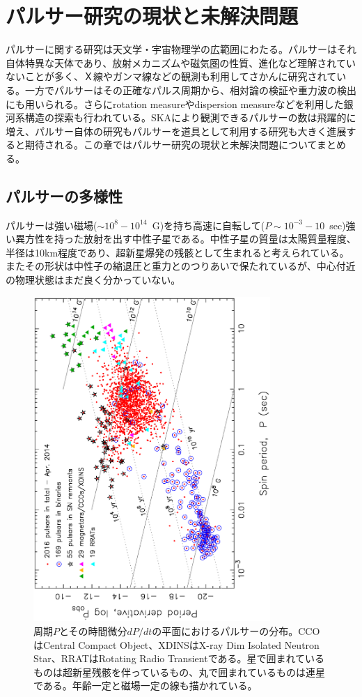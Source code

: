 \section{パルサー研究の現状と未解決問題}\label{pulsar.s1}

パルサーに関する研究は天文学・宇宙物理学の広範囲にわたる。パルサーはそれ自体特異な天体であり、放射メカニズムや磁気圏の性質、進化など理解されていないことが多く、Ｘ線やガンマ線などの観測も利用してさかんに研究されている。一方でパルサーはその正確なパルス周期から、相対論の検証や重力波の検出にも用いられる。さらにrotation measureやdispersion measureなどを利用した銀河系構造の探索も行われている。SKAにより観測できるパルサーの数は飛躍的に増え、パルサー自体の研究もパルサーを道具として利用する研究も大きく進展すると期待される。この章ではパルサー研究の現状と未解決問題についてまとめる。


\subsection{パルサーの多様性}

パルサーは強い磁場($\sim 10^8-10^{14}$~G)を持ち高速に自転して($P\sim 10^{-3}-10$~sec)強い異方性を持った放射を出す中性子星である。中性子星の質量は太陽質量程度、半径は10km程度であり、超新星爆発の残骸として生まれると考えられている。またその形状は中性子の縮退圧と重力とのつりあいで保たれているが、中心付近の物理状態はまだ良く分かっていない。

\begin{figure}[t]
\centering
\includegraphics[width=9cm,angle=270]{pulsar/ppdotdiagram.ps}
\caption{周期$P$とその時間微分$dP/dt$の平面におけるパルサーの分布\citep{Tauris15}。CCOはCentral Compact Object、XDINSはX-ray Dim Isolated Neutron Star、RRATはRotating Radio Transientである。星で囲まれているものは超新星残骸を伴っているもの、丸で囲まれているものは連星である。年齢一定と磁場一定の線も描かれている。}
\label{fig:ppdot}
\end{figure}

